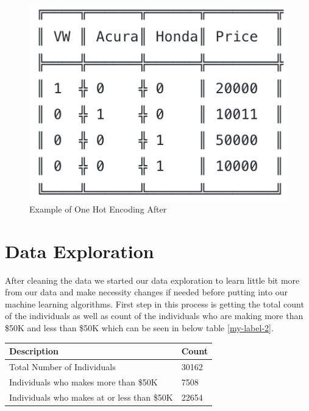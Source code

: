 \documentclass[sigconf]{acmart}
\begin{document}
 \begin{figure}[!ht]
  \centering
      \includegraphics[width=\columnwidth]{project/images/one-hot-after.png}
  \caption{Example of One Hot Encoding After \cite{www-hackernoon}}\label{fig:one-hot-after}
\end{figure}

\section{Data Exploration}

After cleaning the data we started our data exploration to learn little bit more from our data and make necessity changes if needed before putting into our machine learning algorithms. First step in this process is getting the total count of the individuals as well as count of the individuals who are making more than \$50K and less than \$50K which can be seen in below table \ref{my-label-2}.

\begin{center}
\centering
\begin{tabular}{ll}
\hline
\multicolumn{1}{|l|}{\textbf{Description}} & \multicolumn{1}{l|}{\textbf{Count}} \\ \hline
Total Number of Individuals                & 30162                               \\ \hline
Individuals who makes more than \$50K        & 7508                                \\ \hline
Individuals who makes at or less than \$50K  & 22654                              \\ \hline
\end{tabular}
\label{my-label-2}
\end{center}
\end{document}
